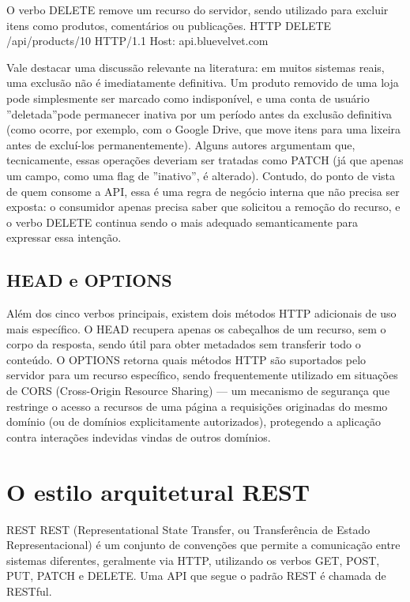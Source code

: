 O verbo DELETE remove um recurso do servidor, sendo utilizado para excluir itens como produtos, comentários ou publicações. HTTP DELETE /api/products/10 HTTP/1.1 Host: api.bluevelvet.com

Vale destacar uma discussão relevante na literatura: em muitos sistemas reais, uma exclusão não é imediatamente definitiva. Um produto removido de uma loja pode simplesmente ser marcado como indisponível, e uma conta de usuário ”deletada”pode permanecer inativa por um período antes da exclusão definitiva (como ocorre, por exemplo, com o Google Drive, que move itens para uma lixeira antes de excluí-los permanentemente). Alguns autores argumentam que, tecnicamente, essas operações deveriam ser tratadas como PATCH (já que apenas um campo, como uma flag de ”inativo”, é alterado). Contudo, do ponto de vista de quem consome a API, essa é uma regra de negócio interna que não precisa ser exposta: o consumidor apenas precisa saber que solicitou a remoção do recurso, e o verbo DELETE continua sendo o mais adequado semanticamente para expressar essa intenção.

\subsection{HEAD e OPTIONS}

Além dos cinco verbos principais, existem dois métodos HTTP adicionais de uso mais específico. O HEAD recupera apenas os cabeçalhos de um recurso, sem o corpo da resposta, sendo útil para obter metadados sem transferir todo o conteúdo. O OPTIONS retorna quais métodos HTTP são suportados pelo servidor para um recurso específico, sendo frequentemente utilizado em situações de CORS (Cross-Origin Resource Sharing) — um mecanismo de segurança que restringe o acesso a recursos de uma página a requisições originadas do mesmo domínio (ou de domínios explicitamente autorizados), protegendo a aplicação contra interações indevidas vindas de outros domínios.

\section{O estilo arquitetural REST}

\begin{infobox}{REST}
REST (Representational State Transfer, ou Transferência de Estado Representacional) é um conjunto de convenções que permite a comunicação entre sistemas diferentes, geralmente via HTTP, utilizando os verbos GET, POST, PUT, PATCH e DELETE. Uma API que segue o padrão REST é chamada de RESTful.
\end{infobox}

